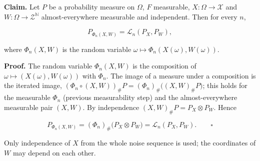 \documentclass[11pt,a4paper]{article}
\begin{document}
\textbf{Claim.} Let \(P\) be a probability measure on \(\Omega\), \(F\) measurable, \(X:\Omega\to\mathcal X\) and \(W:\Omega\to\mathcal Z^{\mathbb N}\) almost-everywhere measurable and independent. Then for every \(n\),


\[P_{\Phi_n(X,W)}=\mathcal L_n(P_X,P_W),\]


where \(\Phi_n(X,W)\) is the random variable \(\omega\mapsto\Phi_n(X(\omega),W(\omega))\).




\textbf{Proof.} The random variable \(\Phi_n(X,W)\) is the composition of \(\omega\mapsto(X(\omega),W(\omega))\) with \(\Phi_n\). The image of a measure under a composition is the iterated image, \((\Phi_n\circ(X,W))_\#P=(\Phi_n)_\#\bigl((X,W)_\#P\bigr)\); this holds for the measurable \(\Phi_n\) (previous measurability step) and the almost-everywhere measurable pair \((X,W)\). By independence \((X,W)_\#P=P_X\otimes P_W\). Hence


\[P_{\Phi_n(X,W)}=(\Phi_n)_\#\bigl(P_X\otimes P_W\bigr)=\mathcal L_n(P_X,P_W).\qquad\square\]


Only independence of \(X\) from the whole noise sequence is used; the coordinates of \(W\) may depend on each other.
\end{document}
